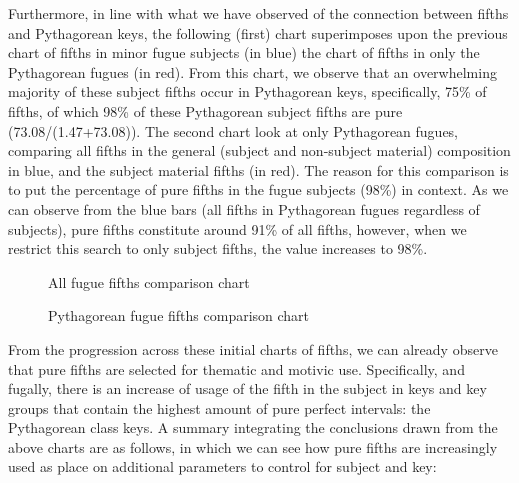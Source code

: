Furthermore, in line with what we have observed of the connection
between fifths and Pythagorean keys, the following (first) chart
superimposes upon the previous chart of fifths in minor fugue subjects
(in blue) the chart of fifths in only the Pythagorean fugues (in red).
From this chart, we observe that an overwhelming majority of these
subject fifths occur in Pythagorean keys, specifically, 75\% of fifths,
of which 98\% of these Pythagorean subject fifths are pure
(73.08/(1.47+73.08)). The second chart look at only Pythagorean fugues,
comparing all fifths in the general (subject and non-subject material)
composition in blue, and the subject material fifths (in red). The
reason for this comparison is to put the percentage of pure fifths in
the fugue subjects (98\%) in context. As we can observe from the blue
bars (all fifths in Pythagorean fugues regardless of subjects), pure
fifths constitute around 91\% of all fifths, however, when we restrict
this search to only subject fifths, the value increases to 98\%.




\begin{figure}[H]
    \begin{center}
    \caption{All fugue fifths comparison chart}
    \end{center}
\end{figure}
    



\begin{figure}[H]
    \begin{center}
    \caption{Pythagorean fugue fifths comparison chart}
    \end{center}
\end{figure}
    

    From the progression across these initial charts of fifths, we can
already observe that pure fifths are selected for thematic and motivic
use. Specifically, and fugally, there is an increase of usage of the
fifth in the subject in keys and key groups that contain the highest
amount of pure perfect intervals: the Pythagorean class keys. A summary
integrating the conclusions drawn from the above charts are as follows,
in which we can see how pure fifths are increasingly used as place on
additional parameters to control for subject and key:

